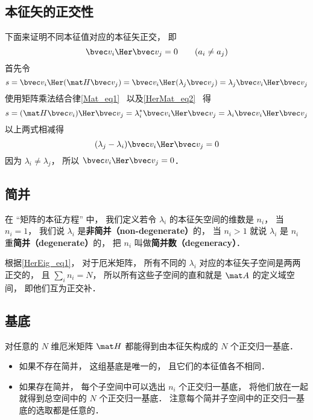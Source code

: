 \subsection{本征矢的正交性}
下面来证明不同本征值对应的本征矢正交， 即
\begin{equation}\label{HerEig_eq1}
\bvec v_i\Her \bvec v_j = 0 \qquad (a_i \ne a_j)
\end{equation}
首先令
\begin{equation}
s = \bvec v_i\Her (\mat H \bvec v_j) = \bvec v_i\Her (\lambda_j \bvec v_j) = \lambda_j \bvec v_i\Her \bvec v_j
\end{equation}
使用矩阵乘法结合律\autoref{Mat_eq1}~ 以及\autoref{HerMat_eq2}~ 得
\begin{equation}
s = (\mat H \bvec v_i)\Her \bvec v_j = \lambda_i^* \bvec v_i\Her \bvec v_j = \lambda_i \bvec v_i\Her \bvec v_j
\end{equation}
以上两式相减得 %
\begin{equation}
(\lambda_j - \lambda_i)\bvec v_i\Her \bvec v_j = 0
\end{equation}
因为 $\lambda_i \ne \lambda_j$， 所以 $\bvec v_i\Her \bvec v_j = 0$．

\subsection{简并}
在 “矩阵的本征方程” 中， 我们定义若令 $\lambda_i$ 的本征矢空间的维数是 $n_i$， 当 $n_i = 1$， 我们说 $\lambda_i$ 是\textbf{非简并（non-degenerate）}的， 当 $n_i > 1$ 就说 $\lambda_i$ 是 $n_i$ 重\textbf{简并（degenerate）}的， 把 $n_i$ 叫做\textbf{简并数（degeneracy）}．

根据\autoref{HerEig_eq1}， 对于厄米矩阵， 所有不同的 $\lambda_i$ 对应的本征矢子空间是两两正交的， 且 $\sum_i n_i = N$， 所以所有这些子空间的直和就是 $\mat A$ 的定义域空间， 即他们互为正交补．

\subsection{基底}
对任意的 $N$ 维厄米矩阵 $\mat H$ 都能得到由本征矢构成的 $N$ 个正交归一基底．
\begin{itemize}
\item 如果不存在简并， 这组基底是唯一的， 且它们的本征值各不相同．
\item 如果存在简并， 每个子空间中可以选出 $n_i$ 个正交归一基底， 将他们放在一起就得到总空间中的 $N$ 个正交归一基底． 注意每个简并子空间中的正交归一基底的选取都是任意的．
\end{itemize}
